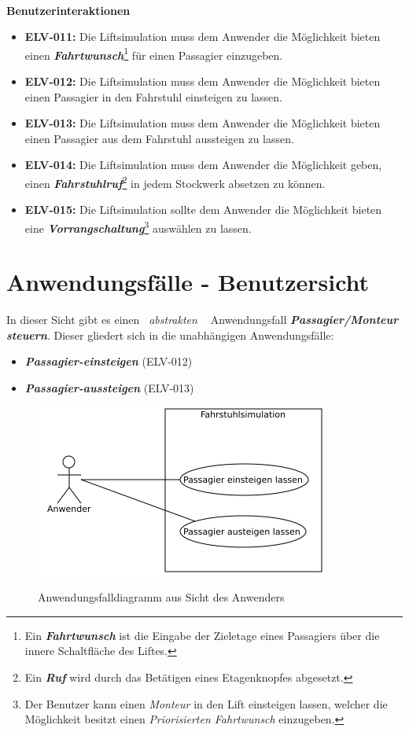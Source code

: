 \paragraph{}
\textbf{Benutzerinteraktionen}
\begin{itemize}
	\item \textbf{ELV-011:}
		Die Liftsimulation muss dem Anwender die Möglichkeit bieten einen \textbf{\textit{Fahrtwunsch}}\footnote{Ein 						\textbf{\textit{Fahrtwunsch}} ist die Eingabe der Zieletage eines Passagiers über die innere Schaltfläche des Liftes.} für einen Passagier 		einzugeben.
	\item \textbf{ELV-012:}
		Die Liftsimulation muss dem Anwender die Möglichkeit bieten einen Passagier in den Fahrstuhl einsteigen zu lassen.
	\item \textbf{ELV-013:}
		Die Liftsimulation muss dem Anwender die Möglichkeit bieten einen Passagier aus dem Fahrstuhl aussteigen zu lassen.
	\item \textbf{ELV-014:}
		Die Liftsimulation muss dem Anwender die Möglichkeit geben, einen \textbf{\textit{Fahrstuhlruf}}\footnote{Ein \textbf{\textit{Ruf}} 		wird durch das Betätigen eines Etagenknopfes abgesetzt.} in jedem Stockwerk absetzen zu können.
	\item \textbf{ELV-015:}
		Die Liftsimulation sollte dem Anwender die Möglichkeit bieten eine \textbf{\textit{Vorrangschaltung}}\footnote{Der Benutzer kann einen 		\textit{Monteur} in den Lift einsteigen lassen, welcher die Möglichkeit besitzt einen \textit{Priorisierten Fahrtwunsch} einzugeben.} 			auswählen zu lassen.
\end{itemize}

\newpage
\section{Anwendungsfälle - Benutzersicht}
In dieser Sicht gibt es einen \textit{\guillemotleft \ abstrakten \ \guillemotright} Anwendungsfall \textit{\textbf{Passagier/Monteur steuern}}. Dieser gliedert sich in die unabhängigen Anwendungsfälle:

\begin{itemize}
	\item \textit{\textbf{Passagier-einsteigen}} (ELV-012)
	\item \textit{\textbf{Passagier-aussteigen}} (ELV-013)
\end{itemize}

\begin{figure}[hbt]
	\includegraphics{images/anwenderAWF.png}
	\label{fig:anwenderAWF}
	\caption{Anwendungsfalldiagramm aus Sicht des Anwenders}
\end{figure}

